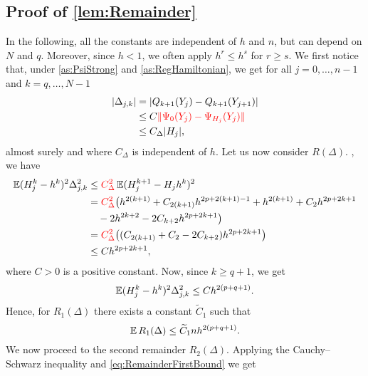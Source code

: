 \documentclass[10pt]{article}
\begin{document}
\subsection*{Proof of \cref{lem:Remainder}}
In the following, all the constants are independent of $h$ and $n$, but can depend on $N$ and $q$. Moreover, since $h < 1$, we often apply $h^r \leq h^s$ for $r \geq s$. We first notice that, under \cref{as:PsiStrong} and \cref{as:RegHamiltonian}, we get for all $j = 0, \ldots, n-1$ and $k = q, \ldots, N-1$
	\begin{equation}\label{eq:RemainderDeltaBound}
	\begin{aligned}
		\lvert\Delta_{j,k}\rvert &= \lvert Q_{k+1}(Y_j) - Q_{k+1}(Y_{j+1})\rvert\\
		&\leq C {\color{red}\lVert\Psi_0(Y_j) - \Psi_{H_j}(Y_j)\rVert}\\
		&\leq C_\Delta \lvert H_j\rvert,
	\end{aligned}
	\end{equation}
	almost surely and where $C_\Delta$ is independent of $h$.  Let us now consider $R(\Delta)$. , we have
	\begin{equation}\label{eq:RemainderFirstBound}
	\begin{aligned}
		\operatorname{\mathbb{E}} (H_j^k - h^k)^2 \Delta_{j,k}^2 &\leq {\color{red}C_\Delta^2}\operatorname{\mathbb{E}}(H_j^{k+1} - H_j h^k)^2\\
		&= {\color{red}C_\Delta^2}\big(h^{2(k+1)} + C_{2(k+1)}h^{2p+2(k+1)-1} + h^{2(k+1)} + C_2 h^{2p+2k+1}  \\
		&\quad - 2h^{2k+2} - 2C_{k+2}h^{2p+2k+1}\big)\\
		&= {\color{red}C_\Delta^2}\big((C_{2(k+1)} + C_2 - 2C_{k+2})h^{2p+2k+1}\big)\\
		&\leq C h^{2p+2k+1},
	\end{aligned}
	\end{equation}
	where $C > 0$ is a positive constant. Now, since $k \geq q+1$, we get
	\begin{equation}\label{eq:RemainderSecondBound}
		\operatorname{\mathbb{E}} (H_j^k - h^k)^2 \Delta_{j,k}^2 \leq C h^{2(p+q+1)}.
	\end{equation}
	Hence, for $R_1(\Delta)$ there exists a constant $\tilde C_1$ such that
	\begin{equation}
		\operatorname{\mathbb{E}} R_1(\Delta) \leq \widetilde C_1 n h^{2(p+q+1)}.
	\end{equation}
	We now proceed to the second remainder $R_2(\Delta)$. Applying the Cauchy--Schwarz inequality and \eqref{eq:RemainderFirstBound} we get
\end{document}

